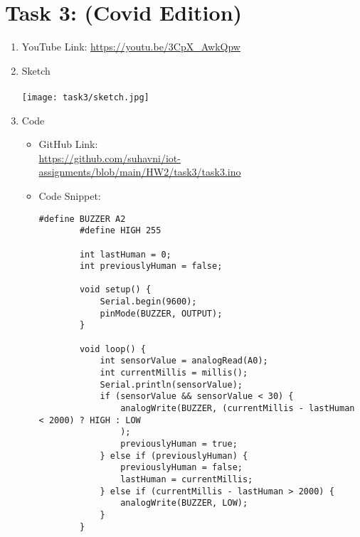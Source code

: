 \documentclass[12pt]{article}
\begin{document}
\section*{Task 3: (Covid Edition)}
\begin{enumerate}
	\item YouTube Link: \href{https://youtu.be/3CpX_AwkQpw}{https://youtu.be/3CpX\_AwkQpw}
		\newpage
	\item Sketch \\\\
		\texttt{[image: task3/sketch.jpg]}
	\item Code
		\begin{itemize}
			\item GitHub Link:\\ 
				\href{https://github.com/suhavni/iot-assignments/blob/main/HW2/task3/task3.ino}{https://github.com/suhavni/iot-assignments/blob/main/HW2/task3/task3.ino}
			\newpage
			\item Code Snippet:
				\begin{lstlisting}[language=Arduino]
		#define BUZZER A2
		#define HIGH 255
		
		int lastHuman = 0;
		int previouslyHuman = false;
		
		void setup() {
			Serial.begin(9600);
			pinMode(BUZZER, OUTPUT);
		}
		
		void loop() {
			int sensorValue = analogRead(A0);
			int currentMillis = millis();
			Serial.println(sensorValue);
			if (sensorValue && sensorValue < 30) {
				analogWrite(BUZZER, (currentMillis - lastHuman < 2000) ? HIGH : LOW
				);
				previouslyHuman = true;
			} else if (previouslyHuman) {
				previouslyHuman = false;
				lastHuman = currentMillis;
			} else if (currentMillis - lastHuman > 2000) {
				analogWrite(BUZZER, LOW);
			} 
		}
		
				\end{lstlisting}
	\end{itemize}
\end{enumerate}
\end{document}

